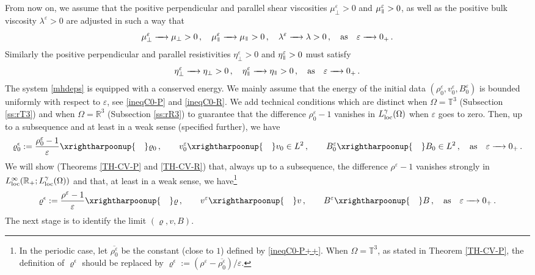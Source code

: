 \documentclass[11pt,reqno]{amsart}
\def \R{{\mathbb{R}}}
\def \T{{\mathbb{T}}}
\newcommand{\myparallel}{{\mkern3mu\vphantom{\perp}\vrule depth 0pt\mkern2mu\vrule depth 0pt\mkern3mu}}
\begin{document}
From now on, we assume that the positive  perpendicular and parallel shear viscosities $\mu_\perp^\varepsilon>0$ and $\mu_\myparallel^\varepsilon>0$, as well as the positive bulk viscosity $\lambda^\varepsilon >0 $ are adjusted in such a way that
\begin{equation}
  \label{visco-norm}
  \mu_\perp^\varepsilon \xrightarrow{\quad}  \mu_\perp >0 \,, \quad  \mu_\myparallel^\varepsilon \xrightarrow{\quad}  \mu_\myparallel > 0 \,,
  \quad \lambda^\varepsilon  \xrightarrow{\quad} \lambda > 0 \,, \quad \mbox{as} \quad  \varepsilon \xrightarrow{\quad} 0_+\,.
\end{equation}
Similarly the positive perpendicular and parallel resistivities $\eta_\perp^\varepsilon>0$ and $\eta_\myparallel^\varepsilon>0$ must satisfy
\begin{equation}
  \label{resis-norm}
  \eta_\perp^\varepsilon \xrightarrow{\quad}  \eta_\perp >0 \,, \quad  \eta_\myparallel^\varepsilon \xrightarrow{\quad}  \eta_\myparallel > 0 \,,
 \quad \mbox{as} \quad \varepsilon \xrightarrow{\quad} 0_+\,.
\end{equation}
The system \eqref{mhdeps} is equipped with a conserved energy. We mainly assume that the energy of the initial data $ (\rho_0^\varepsilon,v_0^\varepsilon,B_0^\varepsilon) $ is bounded uniformly with respect to $ \varepsilon $, see \eqref{ineqC0-P} and \eqref{ineqC0-R}. We add technical conditions which are distinct when $ \Omega = \T^3 $ (Subsection  \ref{ss:rT3}) and when $ \Omega = \R^3 $ (Subsection  \ref{ss:rR3}) to guarantee that the difference $ \rho^\varepsilon_0 - 1 $ vanishes in $ L^\gamma_{\rm loc}(\Omega) $ when $ \varepsilon $ goes to zero. Then,
 up to a subsequence and at least in a weak sense (specified further), we have
\begin{equation*}
 \varrho^\epsilon_0 :=\frac{ \rho^\varepsilon_0  - 1}{\varepsilon} \xrightharpoonup{\quad} \varrho_0 \, , \qquad
 v^\varepsilon_0 \xrightharpoonup{\quad} v_0 \in L^2\,,
 \qquad B^\varepsilon_0 \xrightharpoonup{\quad} B_0 \in L^2 \,, \quad \mbox{as} \quad \varepsilon\xrightarrow{\quad} 0_+\, .
\end{equation*}
We will show (Theorems \ref{TH-CV-P} and \ref{TH-CV-R}) that, always up to a subsequence, the difference $ \rho^\varepsilon  - 1 $ vanishes strongly in $ L_{\rm loc}^\infty ( \R_+; L^\gamma_{\rm loc}(\Omega)) $ and that, at least in a weak sense, we have\footnote{In the periodic case, let $
\overline{\rho_0^\varepsilon} $ be the constant (close to $ 1 $) defined by \eqref{ineqC0-P++}. When $ \Omega = \T^3 $,
as stated in Theorem \ref{TH-CV-P}, the definition of $ \varrho^\epsilon $ should be replaced by $ \varrho^\epsilon:= ( \rho^\varepsilon  -
\overline{\rho_0^\varepsilon} )/\varepsilon $.}
\begin{equation*}
   \varrho^\epsilon:=\frac{ \rho^\varepsilon  - 1}{\varepsilon} \xrightharpoonup{\quad} \varrho \,, \qquad
   v^\varepsilon \xrightharpoonup{\quad} v \,,
 \qquad B^\varepsilon  \xrightharpoonup{\quad} B \,,  \quad \mbox{as} \quad \varepsilon\xrightarrow{\quad} 0_+\, .
\end{equation*}
The next stage is to identify the limit $ (\varrho,v,B) $.
\end{document}
